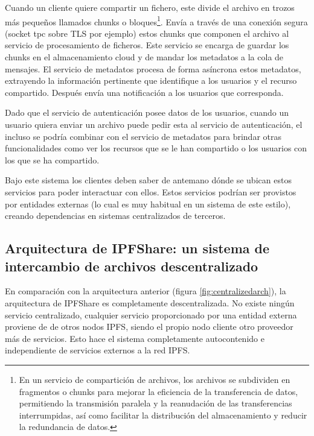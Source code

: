 Cuando un cliente quiere compartir un fichero, este divide el archivo en trozos más pequeños llamados chunks o bloques\footnote{En un servicio de compartición de archivos, los archivos se subdividen en fragmentos o chunks para mejorar la eficiencia de la transferencia de datos, permitiendo la transmisión paralela y la reanudación de las transferencias interrumpidas, así como facilitar la distribución del almacenamiento y reducir la redundancia de datos.}.
Envía a través de una conexión segura (socket tpc sobre TLS por ejemplo) estos chunks que componen el archivo al servicio de procesamiento de ficheros.
Este servicio se encarga de guardar los chunks en el almacenamiento cloud y de mandar los metadatos a la cola de mensajes.
El servicio de metadatos procesa de forma asíncrona estos metadatos, extrayendo la información pertinente que identifique
a los usuarios y el recurso compartido. Después envía una notificación a los usuarios que corresponda.

Dado que el servicio de autenticación posee datos de los usuarios, cuando un usuario quiera enviar un archivo puede
pedir esta al servicio de autenticación, el incluso se podría combinar con el servicio de metadatos para brindar otras funcionalidades como ver los recursos que se le han compartido o los usuarios con los que se ha compartido.

Bajo este sistema los clientes deben saber de antemano dónde se ubican estos servicios para poder interactuar con
ellos. Estos servicios podrían ser provistos por entidades externas (lo cual es muy habitual en un sistema de este estilo), creando dependencias en
sistemas centralizados de terceros.
\subsection{Arquitectura de IPFShare: un sistema de intercambio de archivos descentralizado}
En comparación con la arquitectura anterior (figura \ref{fig:centralizedarch}), la arquitectura de IPFShare es
completamente descentralizada. No existe ningún servicio centralizado, cualquier servicio proporcionado por una entidad externa proviene de
de otros nodos IPFS, siendo el propio nodo cliente otro proveedor más de servicios. Esto hace el sistema completamente autocontenido e independiente de servicios externos
a la red IPFS.

